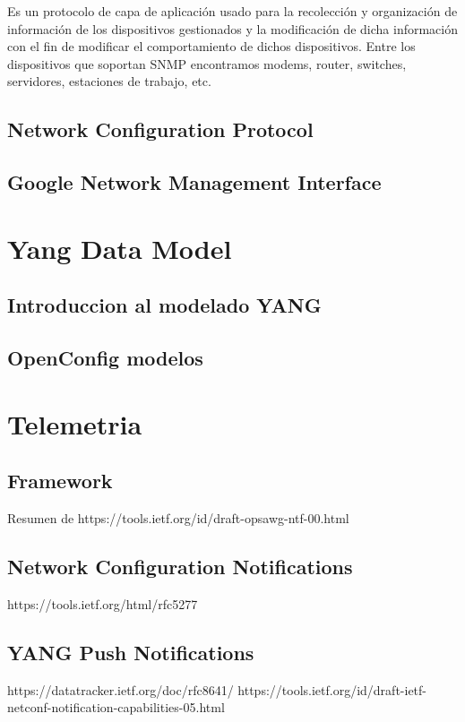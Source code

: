 Es un protocolo de capa de aplicación usado para la recolección y organización de información de los dispositivos gestionados y la modificación de dicha información con el fin de modificar el comportamiento de dichos dispositivos. Entre los dispositivos que soportan SNMP encontramos modems, router, switches, servidores, estaciones de trabajo, etc.




\subsection{Network Configuration Protocol\label{sec:NETCONF}}

\subsection{Google Network Management Interface\label{sec:gNMI}}

\section{Yang Data Model}

\subsection{Introduccion al modelado YANG}

\subsection{OpenConfig modelos}

\section{Telemetria}

\subsection{Framework}

Resumen de
https://tools.ietf.org/id/draft-opsawg-ntf-00.html

\subsection{Network Configuration Notifications\label{sec:NETCONFNot}}

https://tools.ietf.org/html/rfc5277

\subsection{YANG Push Notifications\label{sec:YANGNot}}

https://datatracker.ietf.org/doc/rfc8641/
https://tools.ietf.org/id/draft-ietf-netconf-notification-capabilities-05.html
